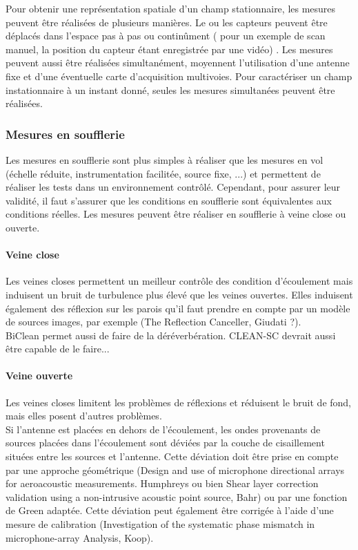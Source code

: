 Pour obtenir une représentation spatiale d'un champ stationnaire, les mesures peuvent être réalisées de plusieurs manières. Le ou les capteurs peuvent être déplacés dans l'espace pas à pas ou continûment (\cite{Comesana2013} pour un exemple de scan manuel, la position du capteur étant enregistrée par une vidéo) . Les mesures peuvent aussi être réalisées simultanément, moyennent l'utilisation d'une antenne fixe et d'une éventuelle carte d'acquisition multivoies. Pour caractériser un champ instationnaire à un instant donné, seules les mesures simultanées peuvent être réalisées.

\subsubsection{Mesures en soufflerie}
Les mesures en soufflerie sont plus simples à réaliser que les mesures en vol (échelle réduite, instrumentation facilitée, source fixe, ...) et permettent de réaliser les tests dans un environnement contrôlé. Cependant, pour assurer leur validité, il faut s'assurer que les conditions en soufflerie sont équivalentes aux conditions réelles. Les mesures peuvent être réaliser en soufflerie à veine close ou ouverte.
\paragraph{Veine close}
 Les veines closes permettent un meilleur contrôle des condition d'écoulement mais induisent un bruit de turbulence plus élevé que les veines ouvertes. Elles induisent également des réflexion sur les parois qu'il faut prendre en compte par un modèle de sources images, par exemple (The Reflection Canceller, Giudati ?).\\
 BiClean permet aussi de faire de la déréverbération. CLEAN-SC devrait aussi être capable de le faire...
 
 \paragraph{Veine ouverte}
 Les veines closes limitent les problèmes de réflexions et réduisent le bruit de fond, mais elles posent d'autres problèmes.\\
 Si l'antenne est placées en dehors de l'écoulement, les ondes provenants de sources placées dans l'écoulement sont déviées par la couche de cisaillement situées entre les sources et l'antenne. Cette déviation doit être prise en compte par une approche géométrique (Design and use of microphone directional arrays for aeroacoustic measurements. Humphreys ou bien Shear layer correction validation using a non-intrusive acoustic point source, Bahr) ou par une fonction de Green adaptée. Cette déviation peut également être corrigée à l'aide d'une mesure de calibration (Investigation  of  the  systematic  phase  mismatch in  microphone-array  Analysis, Koop).


